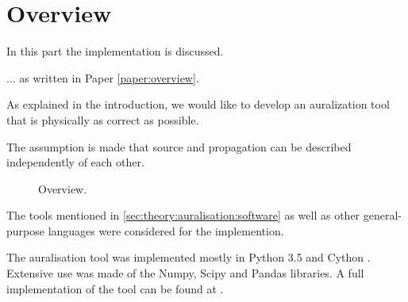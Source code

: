 \section{Overview}

In this part the implementation is discussed.

... as written in Paper \ref{paper:overview}.

As explained in the introduction, we would like to develop an auralization tool that is physically as correct as possible.

The assumption is made that source and propagation can be 
described independently of each other. 


\begin{figure}[H]
  \centering
{}
  \caption{Overview.}
  \label{fig:implementation:overview}
\end{figure}

The tools mentioned in \ref{sec:theory:auralisation:software} as well as other
general-purpose languages were considered for the implemention.

The auralisation tool was implemented mostly in Python 3.5 \cite{Python} and
Cython \cite{Behnel2011,Cython}. Extensive use was made of the
Numpy\cite{VanderWalt2011,Numpy}, Scipy\cite{Scipy} and
Pandas\cite{Mckinney2010} libraries. A full implementation of the tool can be
found at \cite{Rietdijk2017d}.
